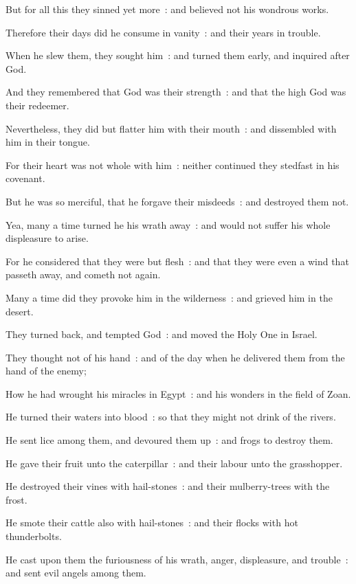 But for all this they sinned yet more~: and believed not his wondrous works.\par
{}Therefore their days did he consume in vanity~: and their years in trouble.\par
{}When he slew them, they sought him~: and turned them early, and inquired after God.\par
{}And they remembered that God was their strength~: and that the high God was their redeemer.\par
{}Nevertheless, they did but flatter him with their mouth~: and dissembled with him in their tongue.\par
{}For their heart was not whole with him~: neither continued they stedfast in his covenant.\par
{}But he was so merciful, that he forgave their misdeeds~: and destroyed them not.\par
{}Yea, many a time turned he his wrath away~: and would not suffer his whole displeasure to arise.\par
{}For he considered that they were but flesh~: and that they were even a wind that passeth away, and cometh not again.\par
{}Many a time did they provoke him in the wilderness~: and grieved him in the desert.\par
{}They turned back, and tempted God~: and moved the Holy One in Israel.\par
{}They thought not of his hand~: and of the day when he delivered them from the hand of the enemy;\par
{}How he had wrought his miracles in Egypt~: and his wonders in the field of Zoan.\par
{}He turned their waters into blood~: so that they might not drink of the rivers.\par
{}He sent lice among them, and devoured them up~: and frogs to destroy them.\par
{}He gave their fruit unto the caterpillar~: and their labour unto the grasshopper.\par
{}He destroyed their vines with hail-stones~: and their mulberry-trees with the frost.\par
{}He smote their cattle also with hail-stones~: and their flocks with hot thunderbolts.\par
{}He cast upon them the furiousness of his wrath, anger, displeasure, and trouble~: and sent evil angels among them.\par
